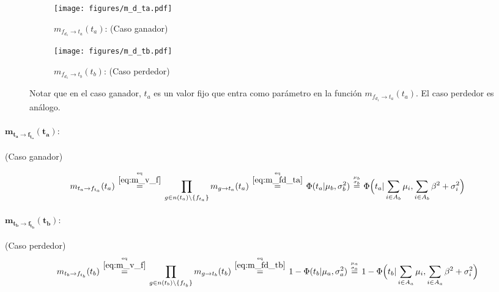 \documentclass[article]{jss}
\newcommand\hfrac[2]{\genfrac{}{}{0pt}{}{#1}{#2}} %
\begin{document}
\begin{figure}[t!]
\centering
  \begin{subfigure}[t]{0.48\textwidth}
  \texttt{[image: figures/m\_d\_ta.pdf]}
  \caption{$m_{f_{d_1} \rightarrow t_a}(t_a)$: (Caso ganador)}
  \label{fig:m_fd_ta}
  \end{subfigure}
  \begin{subfigure}[t]{0.48\textwidth}
  \texttt{[image: figures/m\_d\_tb.pdf]}
  \caption{$m_{f_{d_1} \rightarrow t_b}(t_b)$: (Caso perdedor)}
  \label{fig:m_fd_tb}
  \end{subfigure}
  \caption{Notar que en el caso ganador, $t_a$ es un valor fijo que entra como par\'ametro en la funci\'on $m_{f_{d_1} \rightarrow t_a}(t_a)$. El caso perdedor es an\'alogo.}
  \label{fig:m_fd_t}
\end{figure}

\paragraph{$\bm{m_{t_a \rightarrow f_{t_a}}(t_a)}:$} (Caso ganador)

\begin{equation}\label{eq:m_ta_ft}
\begin{split}
 m_{t_a \rightarrow f_{t_a}}(t_a) \overset{\hfrac{\text{eq}}{\ref{eq:m_v_f}}}{=} \prod_{g \in n(t_a) \setminus  \{f_{t_a} \}} m_{g \rightarrow t_a} (t_a)  \overset{\hfrac{\text{eq}}{\ref{eq:m_fd_ta}}}{=} \Phi(t_a|\mu_b,\sigma_b^2) \overset{\hfrac{\mu_b}{\sigma_b}}{=} \Phi \Big(t_a| \sum_{i \in A_b} \mu_i , \sum_{i \in A_b} \beta^2 + \sigma_i^2 \Big)
\end{split}
\end{equation}

\paragraph{$\bm{m_{t_b \rightarrow f_{t_b}}(t_b)}:$} (Caso perdedor)
\begin{equation}\label{eq:m_tb_ft}
\begin{split}
 m_{t_b \rightarrow f_{t_b}}(t_b) \overset{\hfrac{\text{eq}}{\ref{eq:m_v_f}}}{=} \prod_{g \in n(t_b) \setminus  \{f_{t_b} \}} m_{g \rightarrow t_b} (t_b)  \overset{\hfrac{\text{eq}}{\ref{eq:m_fd_tb}}}{=} 1- \Phi(t_b|\mu_a,\sigma_a^2) \overset{\hfrac{\mu_a}{\sigma_a}}{=} 1 - \Phi \Big(t_b| \sum_{i \in A_a} \mu_i , \sum_{i \in A_a} \beta^2 + \sigma_i^2 \Big)
\end{split}
\end{equation}
\end{document}
